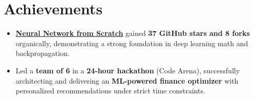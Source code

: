 \documentclass[a4paper,10pt]{article}
\begin{document}
\section*{Achievements}
\begin{itemize}
    \item \textbf{\href{https://github.com/hetbhalani/Neural_Network_from_Scratch}{Neural Network from Scratch}} gained \textbf{37 GitHub stars and 8 forks} organically, demonstrating a strong foundation in deep learning math and backpropagation.
    \item Led a \textbf{team of 6} in a \textbf{24-hour hackathon} (Code Arena), successfully architecting and delivering an \textbf{ML-powered finance optimizer} with personalized recommendations under strict time constraints.
\end{itemize}
\end{document}
